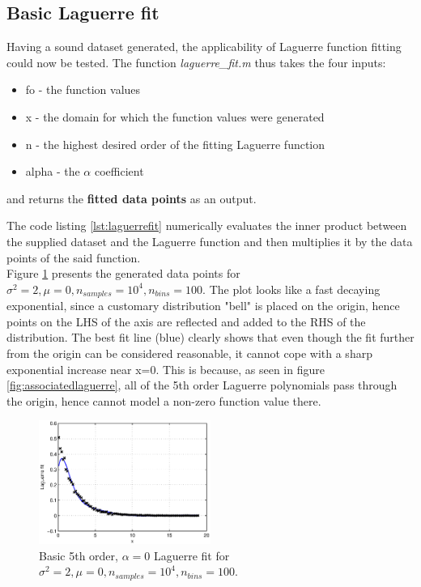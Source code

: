\documentclass[a4paper]{article}
\numberwithin{equation}{section}
\begin{document}
\subsection{Basic Laguerre fit}
Having a sound dataset generated, the applicability of Laguerre function fitting could now be tested. The function \textit{laguerre\_fit.m} thus takes the four inputs:
\begin{itemize}
\item fo - the function values
\item x - the domain for which the function values were generated
\item n - the highest desired order of the fitting Laguerre function
\item alpha - the $\alpha$ coefficient
\end{itemize}
and returns the \textbf{fitted data points} as an output.



\noindent The code listing \ref{lst:laguerrefit} numerically evaluates the inner product between the supplied dataset and the Laguerre function and then multiplies it by the data points of the said function. \\

\noindent Figure \ref{fig:basicfit} presents the generated data points for $\sigma^2=2, \mu=0, n_{samples}=10^4, n_{bins}=100$. The plot looks like a fast decaying exponential, since a customary distribution "bell" is placed on the origin, hence points on the LHS of the axis are reflected and added to the RHS of the distribution. The best fit line (blue) clearly shows that even though the fit further from the origin can be considered reasonable, it cannot cope with a sharp exponential increase near x=0. This is because, as seen in figure \ref{fig:associatedlaguerre}, all of the 5th order Laguerre polynomials pass through the origin, hence cannot model a non-zero function value there.

\begin{figure}[!h]
\centering
\includegraphics[width=0.5\textwidth]{basic_fit.eps}
\caption{\label{fig:basicfit}Basic 5th order, $\alpha=0$ Laguerre fit for $\sigma^2=2, \mu=0, n_{samples}=10^4, n_{bins}=100$.}
\end{figure}
\end{document}
